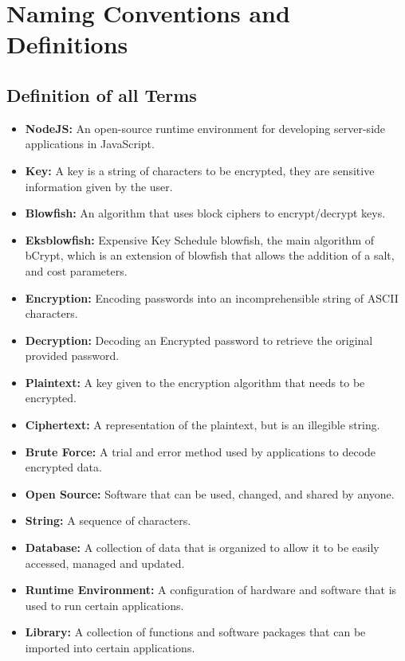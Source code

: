 \documentclass[12pt]{article}
\begin{document}
\section{Naming Conventions and Definitions}
\subsection{Definition of all Terms}

\begin{itemize}
	\item \textbf{NodeJS:} An open-source runtime environment for developing server-side applications in JavaScript. 
	\item \textbf{Key:}  A key is a string of characters to be encrypted, they are sensitive information given by the user.
	\item \textbf{Blowfish:} An algorithm that uses block ciphers to encrypt/decrypt keys. 
	\item \textbf{Eksblowfish:}  Expensive Key Schedule blowfish, the main algorithm of bCrypt, which is an extension of blowfish that allows the addition of a salt, and cost parameters.  
	\item \textbf{Encryption:}  Encoding passwords into an incomprehensible string of ASCII characters. 
	\item \textbf{Decryption:} Decoding an Encrypted password to retrieve the original provided password. 
	\item \textbf{Plaintext:} A key given to the encryption algorithm that needs to be encrypted. 
	\item \textbf{Ciphertext:} A representation of the plaintext, but is an illegible string. 
	\item \textbf{Brute Force:}  A trial and error method used by applications to decode encrypted data. 
	\item \textbf{Open Source:} Software that can be used, changed, and shared by anyone. 
	\item \textbf{String:}  A sequence of characters. 
	\item \textbf{Database:}  A collection of data that is organized to allow it to be easily accessed, managed and updated. 
	\item \textbf{Runtime Environment:} A configuration of hardware and software that is used to run certain applications.
	\item \textbf{Library:}  A collection of functions and software packages that can be imported into certain applications.  
\end{itemize}
\end{document}
